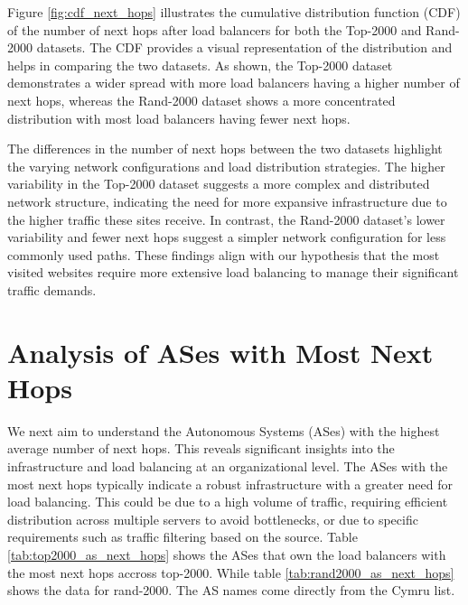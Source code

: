 \documentclass[12pt]{cwru_thesis}
\begin{document}
Figure \ref{fig:cdf_next_hops} illustrates the cumulative distribution function (CDF) of the number of next hops after load balancers for both the Top-2000 and Rand-2000 datasets. The CDF provides a visual representation of the distribution and helps in comparing the two datasets. As shown, the Top-2000 dataset demonstrates a wider spread with more load balancers having a higher number of next hops, whereas the Rand-2000 dataset shows a more concentrated distribution with most load balancers having fewer next hops.



The differences in the number of next hops between the two datasets highlight the varying network configurations and load distribution strategies. The higher variability in the Top-2000 dataset suggests a more complex and distributed network structure, indicating the need for more expansive infrastructure due to the higher traffic these sites receive. In contrast, the Rand-2000 dataset's lower variability and fewer next hops suggest a simpler network configuration for less commonly used paths. These findings align with our hypothesis that the most visited websites require more extensive load balancing to manage their significant traffic demands.
\newpage
\section{Analysis of ASes with Most Next Hops}

We next aim to understand the Autonomous Systems (ASes) with the highest average number of next hops.  This reveals significant insights into the infrastructure and load balancing at an organizational level.
The ASes with the most next hops typically indicate a robust infrastructure with a greater need for load balancing. This could be due to a high volume of traffic, requiring efficient distribution across multiple servers to avoid bottlenecks, or due to specific requirements such as traffic filtering based on the source. Table \ref{tab:top2000_as_next_hops} shows the ASes that own the load balancers with the most next hops accross top-2000. While table \ref{tab:rand2000_as_next_hops} shows the data for rand-2000. The AS names come directly from the Cymru list. \\
\end{document}
